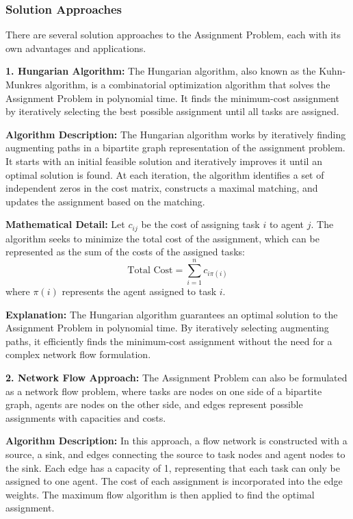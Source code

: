 \documentclass[12pt]{book} %
\begin{document}
\subsubsection{Solution Approaches}
There are several solution approaches to the Assignment Problem, each with its own advantages and applications.

\textbf{1. Hungarian Algorithm:}
The Hungarian algorithm, also known as the Kuhn-Munkres algorithm, is a combinatorial optimization algorithm that solves the Assignment Problem in polynomial time. It finds the minimum-cost assignment by iteratively selecting the best possible assignment until all tasks are assigned.

\textbf{Algorithm Description:}
The Hungarian algorithm works by iteratively finding augmenting paths in a bipartite graph representation of the assignment problem. It starts with an initial feasible solution and iteratively improves it until an optimal solution is found. At each iteration, the algorithm identifies a set of independent zeros in the cost matrix, constructs a maximal matching, and updates the assignment based on the matching.

\textbf{Mathematical Detail:}
Let \(c_{ij}\) be the cost of assigning task \(i\) to agent \(j\). The algorithm seeks to minimize the total cost of the assignment, which can be represented as the sum of the costs of the assigned tasks:
\[
\text{Total Cost} = \sum_{i=1}^{n} c_{i\pi(i)}
\]
where \(\pi(i)\) represents the agent assigned to task \(i\).

\textbf{Explanation:}
The Hungarian algorithm guarantees an optimal solution to the Assignment Problem in polynomial time. By iteratively selecting augmenting paths, it efficiently finds the minimum-cost assignment without the need for a complex network flow formulation.

\textbf{2. Network Flow Approach:}
The Assignment Problem can also be formulated as a network flow problem, where tasks are nodes on one side of a bipartite graph, agents are nodes on the other side, and edges represent possible assignments with capacities and costs.

\textbf{Algorithm Description:}
In this approach, a flow network is constructed with a source, a sink, and edges connecting the source to task nodes and agent nodes to the sink. Each edge has a capacity of 1, representing that each task can only be assigned to one agent. The cost of each assignment is incorporated into the edge weights. The maximum flow algorithm is then applied to find the optimal assignment.
\end{document}
